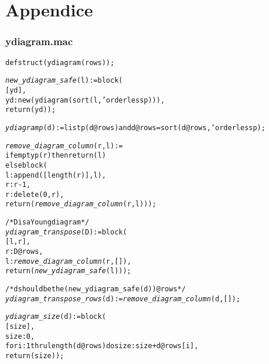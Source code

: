 \small
\chapter*{Appendice}
\subsection*{ydiagram.mac}
\begin{alltt}
\footnotesize
defstruct (ydiagram (rows));

\emph{new\_ydiagram\_safe} (l) := block (
  [yd],
  yd : new (ydiagram (sort (l, 'orderlessp))),
  return (yd));

\emph{ydiagramp} (d) := listp (d@rows) and d@rows = sort (d@rows, 'orderlessp);

\emph{remove\_diagram\_column} (r, l) := 
if emptyp (r) then return (l)
else block (
  l : append ([length (r)], l),
  r : r-1,
  r : delete (0, r),
  return (\emph{remove\_diagram\_column} (r, l)));

/* D is a Young diagram */
\emph{ydiagram\_transpose} (D) := block (
  [l,r],
  r : D@rows,
  l : \emph{remove\_diagram\_column} (r, []),
  return (\emph{new\_ydiagram\_safe} (l)));

/* d should be the (new\_ydiagram\_safe (d))@rows */
\emph{ydiagram\_transpose\_rows} (d) := \emph{remove\_diagram\_column} (d, []);

\emph{ydiagram\_size} (d) := block (
  [size],
  size : 0,
  for i : 1 thru length (d@rows) do size : size+d@rows[i],
  return (size));
\end{alltt}
\small

